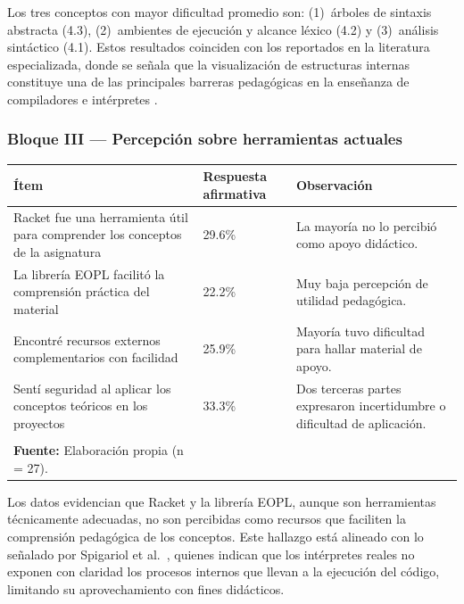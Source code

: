 Los tres conceptos con mayor dificultad promedio son: (1)~árboles de sintaxis abstracta (4.3), (2)~ambientes de ejecución y alcance léxico (4.2) y (3)~análisis sintáctico (4.1). Estos resultados coinciden con los reportados en la literatura especializada, donde se señala que la visualización de estructuras internas constituye una de las principales barreras pedagógicas en la enseñanza de compiladores e intérpretes \cite{Stamenković2024AWE, delvado2023itt}.

\subsubsection{Bloque III — Percepción sobre herramientas actuales}

\begin{longtable}{|p{8.5cm}|p{2.2cm}|p{3.8cm}|}
    \hline
    \textbf{Ítem} & \textbf{Respuesta afirmativa} & \textbf{Observación} \\
    \hline
    \endhead
    Racket fue una herramienta útil para comprender los conceptos de la asignatura & 29.6\% & La mayoría no lo percibió como apoyo didáctico. \\
    \hline
    La librería EOPL facilitó la comprensión práctica del material & 22.2\% & Muy baja percepción de utilidad pedagógica. \\
    \hline
    Encontré recursos externos complementarios con facilidad & 25.9\% & Mayoría tuvo dificultad para hallar material de apoyo. \\
    \hline
    Sentí seguridad al aplicar los conceptos teóricos en los proyectos & 33.3\% & Dos terceras partes expresaron incertidumbre o dificultad de aplicación. \\
    \hline
    \caption{Percepción de los estudiantes sobre las herramientas y recursos actuales de la asignatura.\\
    \scriptsize \textbf{Fuente:} Elaboración propia (n = 27).}
    \label{tab:percepcion-herramientas}
\end{longtable}

Los datos evidencian que Racket y la librería EOPL, aunque son herramientas técnicamente adecuadas, no son percibidas como recursos que faciliten la comprensión pedagógica de los conceptos. Este hallazgo está alineado con lo señalado por Spigariol et al.\ \cite{Spigariol2023Aprendiendo}, quienes indican que los intérpretes reales no exponen con claridad los procesos internos que llevan a la ejecución del código, limitando su aprovechamiento con fines didácticos.

